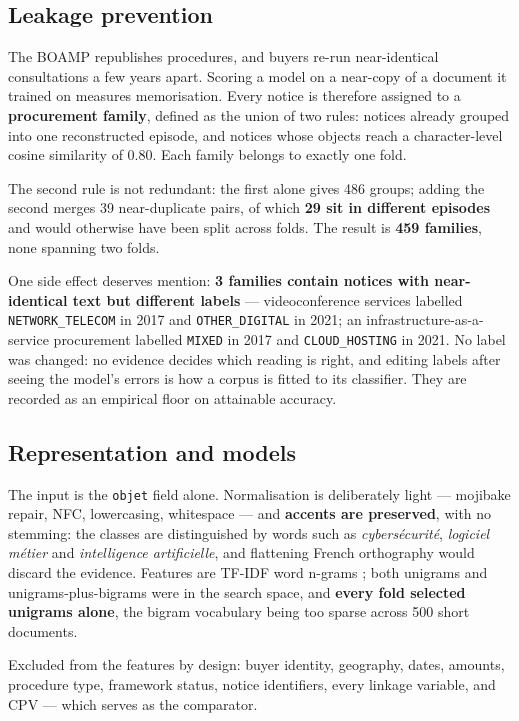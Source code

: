 \subsection{Leakage prevention}

The BOAMP republishes procedures, and buyers re-run near-identical consultations a few years apart. Scoring a model on a near-copy of a document it trained on measures memorisation. Every notice is therefore assigned to a \textbf{procurement family}, defined as the union of two rules: notices already grouped into one reconstructed episode, and notices whose objects reach a character-level cosine similarity of 0.80. Each family belongs to exactly one fold.

The second rule is not redundant: the first alone gives 486 groups; adding the second merges 39 near-duplicate pairs, of which \textbf{29 sit in different episodes} and would otherwise have been split across folds. The result is \textbf{459 families}, none spanning two folds.

One side effect deserves mention: \textbf{3 families contain notices with near-identical text but different labels} --- videoconference services labelled \texttt{NETWORK\_TELECOM} in 2017 and \texttt{OTHER\_DIGITAL} in 2021; an infrastructure-as-a-service procurement labelled \texttt{MIXED} in 2017 and \texttt{CLOUD\_HOSTING} in 2021. No label was changed: no evidence decides which reading is right, and editing labels after seeing the model's errors is how a corpus is fitted to its classifier. They are recorded as an empirical floor on attainable accuracy.

\subsection{Representation and models}

The input is the \texttt{objet} field alone. Normalisation is deliberately light --- mojibake repair, NFC, lowercasing, whitespace --- and \textbf{accents are preserved}, with no stemming: the classes are distinguished by words such as \emph{cybersécurité}, \emph{logiciel métier} and \emph{intelligence artificielle}, and flattening French orthography would discard the evidence. Features are TF-IDF word n-grams \citep{salton1988}; both unigrams and unigrams-plus-bigrams were in the search space, and \textbf{every fold selected unigrams alone}, the bigram vocabulary being too sparse across 500 short documents.

Excluded from the features by design: buyer identity, geography, dates, amounts, procedure type, framework status, notice identifiers, every linkage variable, and CPV --- which serves as the comparator.

